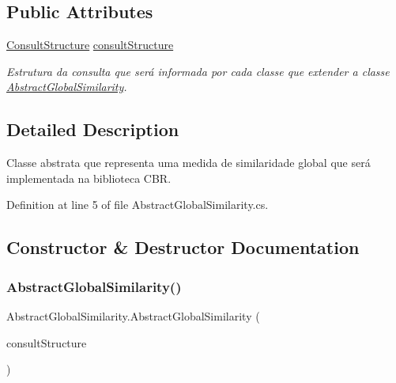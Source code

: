 \subsection*{Public Attributes}
\begin{DoxyCompactItemize}
\item 
\hyperlink{class_consult_structure}{Consult\+Structure} \hyperlink{class_abstract_global_similarity_a471ea41af416fd702d48f3b143416e66}{consult\+Structure}
\begin{DoxyCompactList}\small\item\em Estrutura da consulta que será informada por cada classe que extender a classe \hyperlink{class_abstract_global_similarity}{Abstract\+Global\+Similarity}. \end{DoxyCompactList}\end{DoxyCompactItemize}


\subsection{Detailed Description}
Classe abstrata que representa uma medida de similaridade global que será implementada na biblioteca C\+BR. 



Definition at line 5 of file Abstract\+Global\+Similarity.\+cs.



\subsection{Constructor \& Destructor Documentation}
\hypertarget{class_abstract_global_similarity_ac13f827a8680ef4b6ee0d40911969f16}{}\label{class_abstract_global_similarity_ac13f827a8680ef4b6ee0d40911969f16} 
\subsubsection{\texorpdfstring{Abstract\+Global\+Similarity()}{AbstractGlobalSimilarity()}}
{\footnotesize\ttfamily Abstract\+Global\+Similarity.\+Abstract\+Global\+Similarity (\begin{DoxyParamCaption}\item[{\hyperlink{class_consult_structure}{Consult\+Structure}}]{consult\+Structure }\end{DoxyParamCaption})}



